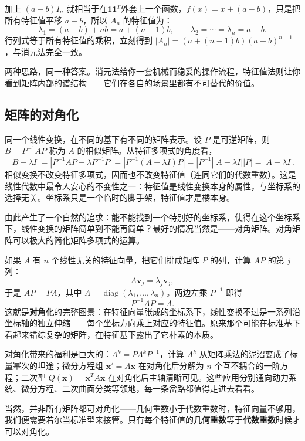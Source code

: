 \documentclass[UTF8]{ctexbook}
\begin{document}
加上 $(a-b)I_n$ 就相当于在$\mathbf{1}\mathbf{1}^T$外套上一个函数，$f(x)=x+(a-b)$，只是把所有特征值平移 $a-b$，所以 $A_n$ 的特征值为：
\[
\lambda_1=(a-b)+nb=a+(n-1)b,\qquad \lambda_2=\cdots=\lambda_n=a-b.
\]
行列式等于所有特征值的乘积，立刻得到 $|A_n|=(a+(n-1)b)(a-b)^{n-1}$，与消元法完全一致\label{rank_one_correction_determinant_eigenvalue}\pageref{rank_one_correction_determinant_conservation}。

两种思路，同一种答案。消元法给你一套机械而稳妥的操作流程，特征值法则让你看到矩阵内部的谱结构——它们在各自的场景里都有不可替代的价值。


\subsection{矩阵的对角化}

同一个线性变换，在不同的基下有不同的矩阵表示。设 $P$ 是可逆矩阵，则 $B=P^{-1}AP$ 称为 $A$ 的相似矩阵。从特征多项式的角度看，
\[
|B-\lambda I|=|P^{-1}AP-\lambda P^{-1}P|=|P^{-1}(A-\lambda I)P|=|P^{-1}||A-\lambda I||P|=|A-\lambda I|.
\]
相似变换不改变特征多项式，因而也不改变特征值（连同它们的代数重数）。这是线性代数中最令人安心的不变性之一：特征值是线性变换本身的属性，与坐标系的选择无关。坐标系只是一个临时的脚手架，特征值才是楼本身。

由此产生了一个自然的追求：能不能找到一个特别好的坐标系，使得在这个坐标系下，线性变换的矩阵简单到不能再简单？最好的情况当然是——对角矩阵。对角矩阵可以极大的简化矩阵多项式的运算\pageref{matrix_polynomial}\label{eigenvalue}。



如果 $A$ 有 $n$ 个线性无关的特征向量，把它们排成矩阵 $P$ 的列，计算 $AP$ 的第 $j$ 列：
\[
A\mathbf{v}_j=\lambda_j\mathbf{v}_j,
\]
于是 $AP=P\Lambda$，其中 $\Lambda=\operatorname{diag}(\lambda_1,\dots,\lambda_n)$。两边左乘 $P^{-1}$ 即得
\[
P^{-1}AP=\Lambda.
\]
这就是\textbf{对角化}的完整图景：在特征向量张成的坐标系下，线性变换不过是一系列沿坐标轴的独立伸缩——每个坐标方向乘上对应的特征值。原来那个可能在标准基下看起来错综复杂的矩阵，在特征基下露出了它朴素的本质。

对角化带来的福利是巨大的：$A^k = P \Lambda^k P^{-1}$，计算 $A^k$ 从矩阵乘法的泥沼变成了标量幂次的坦途；微分方程组 $\mathbf{x}' = A\mathbf{x}$ 在对角化后分解为 $n$ 个互不耦合的一阶方程；二次型 $Q(\mathbf{x}) = \mathbf{x}^T A \mathbf{x}$ 在对角化后主轴清晰可见\pageref{2times}。这些应用分别通向动力系统、微分方程、二次曲面分类等领地，每一条岔路都值得走进去看看。

当然，并非所有矩阵都可对角化——几何重数小于代数重数时，特征向量不够用，我们便需要若尔当标准型来接管。只有每个特征值的\textbf{几何重数}等于\textbf{代数重数}时候才可以对角化。
\end{document}
